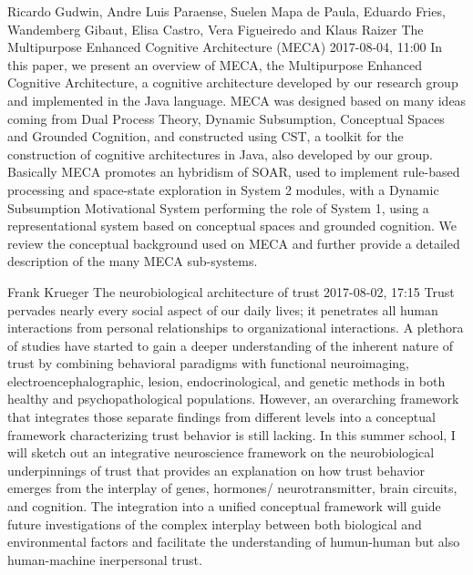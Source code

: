 \documentclass[10pt,fleqn,openany]{book} %
\begin{document}
\begin{enumerate}
		
		\paperabstract
		{Ricardo Gudwin, Andre Luis Paraense, Suelen Mapa de Paula, Eduardo Fries, Wandemberg Gibaut, Elisa Castro, Vera Figueiredo and Klaus Raizer}
		{The Multipurpose Enhanced Cognitive Architecture (MECA)}
		{2017-08-04, 11:00}
		{In this paper, we present an overview of MECA, the Multipurpose Enhanced Cognitive Architecture, a cognitive architecture developed by our research group and implemented in the Java language. MECA was designed based on many ideas coming from Dual Process Theory, Dynamic Subsumption, Conceptual Spaces and Grounded Cognition, and constructed using CST, a toolkit for the construction of cognitive architectures in Java, also developed by our group. Basically MECA promotes an hybridism of SOAR, used to implement rule-based processing and space-state exploration in System 2 modules, with a Dynamic Subsumption Motivational System performing the role of System 1, using a representational system based on conceptual spaces and grounded cognition. We review the conceptual background used on MECA and further provide a detailed description of the many MECA sub-systems.}
		
		
		\paperabstract
		{Frank Krueger}
		{The neurobiological architecture of trust}
		{2017-08-02, 17:15}
		{Trust pervades nearly every social aspect of our daily lives; it penetrates all human interactions from personal relationships to organizational interactions. A plethora of studies have started to gain a deeper understanding of the inherent nature of trust by combining behavioral paradigms with functional neuroimaging, electroencephalographic, lesion, endocrinological, and genetic methods in both healthy and psychopathological populations. However, an overarching framework that integrates those separate findings from different levels into a conceptual framework characterizing trust behavior is still lacking. In this summer school, I will sketch out an integrative neuroscience framework on the neurobiological underpinnings of trust that provides an explanation on how trust behavior emerges from the interplay of genes, hormones/ neurotransmitter, brain circuits, and cognition. The integration into a unified conceptual framework will guide future investigations of the complex interplay between both biological and environmental factors and facilitate the understanding of humun-human but also human-machine inerpersonal trust.}
		

\end{enumerate}
\end{document}
